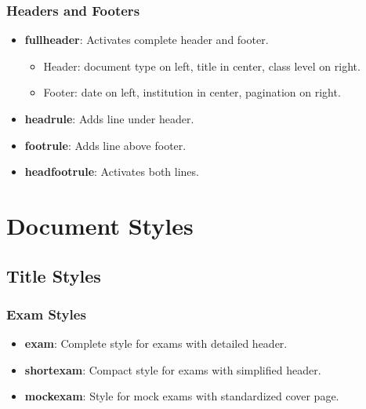 \documentclass[
    margin=2cm
]{neoschool}
\begin{document}
\subsubsection{Headers and Footers}

\begin{itemize}
\item
  \textbf{fullheader}: Activates complete header and footer.

  \begin{itemize}
    \item
    Header: document type on left, title in center, class level on
    right.
  \item
    Footer: date on left, institution in center, pagination on right.
  \end{itemize}
\item
  \textbf{headrule}: Adds line under header.
\item
  \textbf{footrule}: Adds line above footer.
\item
  \textbf{headfootrule}: Activates both lines.
\end{itemize}

\section{Document Styles}

\subsection{Title Styles}

\subsubsection{Exam Styles}

\begin{itemize}
\item
  \textbf{exam}: Complete style for exams with detailed header.
\end{itemize}


\begin{itemize}
\item
  \textbf{shortexam}: Compact style for exams with simplified header.
\item
  \textbf{mockexam}: Style for mock exams with standardized cover page.
\end{itemize}
\end{document}
